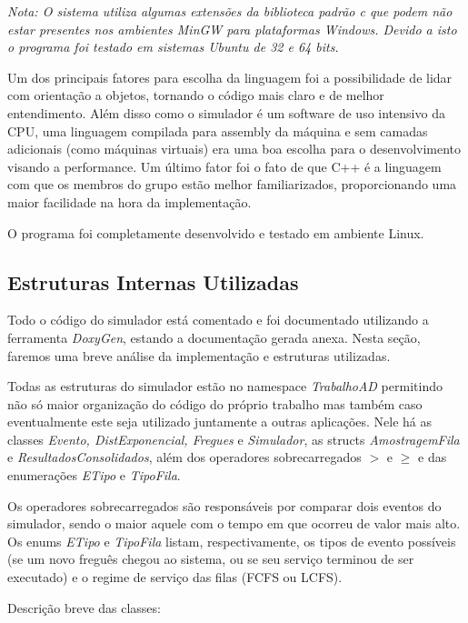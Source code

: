\documentclass[a4paper,10pt]{article}
\begin{document}
\emph{Nota: O sistema utiliza algumas extensões da biblioteca padrão c que podem não estar presentes nos ambientes MinGW para plataformas Windows. Devido a isto o programa foi testado em sistemas Ubuntu de 32 e 64 bits.}

    Um dos principais fatores para escolha da linguagem foi a possibilidade de lidar com orientação a objetos, tornando o código mais claro e de melhor entendimento. Além disso como o simulador é um software de uso intensivo da CPU, uma linguagem compilada para assembly da máquina e sem camadas adicionais (como máquinas virtuais) era uma boa escolha para o desenvolvimento visando a performance. Um último fator foi o fato de que C++ é a linguagem com que os membros do grupo estão melhor familiarizados, proporcionando uma maior facilidade na hora da implementação.

    O programa foi completamente desenvolvido e testado em ambiente Linux.

\subsection{Estruturas Internas Utilizadas}

    Todo o código do simulador está comentado e foi documentado utilizando a ferramenta \emph{DoxyGen}, estando a documentação gerada anexa. Nesta seção, faremos uma breve análise da implementação e estruturas utilizadas.

    Todas as estruturas do simulador estão no namespace \emph{TrabalhoAD} permitindo não só maior organização do código do próprio trabalho mas também caso eventualmente este seja utilizado juntamente a outras aplicações. Nele há as classes \emph{Evento, DistExponencial, Fregues} e \emph{Simulador}, as structs \emph{AmostragemFila} e \emph{ResultadosConsolidados}, além dos operadores sobrecarregados \emph{$>$} e \emph{$\geq$} e das enumerações \emph{ETipo} e \emph{TipoFila}.

    Os operadores sobrecarregados são responsáveis por comparar dois eventos do simulador, sendo o maior aquele com o tempo em que ocorreu de valor mais alto. Os enums \emph{ETipo} e \emph{TipoFila} listam, respectivamente, os tipos de evento possíveis (se um novo freguês chegou ao sistema, ou se seu serviço terminou de ser executado) e o regime de serviço das filas (FCFS ou LCFS).

    Descrição breve das classes:
\end{document}
